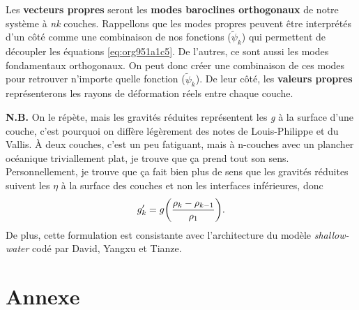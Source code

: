 \documentclass[10pt]{report}
\numberwithin{equation}{section}
\newcommand{\tpsi}{\tilde{\psi}}
\begin{document}
Les \textbf{vecteurs propres} seront les \textbf{modes baroclines orthogonaux} de notre système à \emph{nk} couches.
Rappellons que les modes propres peuvent être interprétés d'un côté comme une combinaison de nos fonctions (\(\tpsi_k\)) qui permettent de découpler les équations \ref{eq:org951a1c5}.
De l'autres, ce sont aussi les modes fondamentaux orthogonaux.
On peut donc créer une combinaison de ces modes pour retrouver n'importe quelle fonction (\(\tpsi_k\)).
De leur côté, les \textbf{valeurs propres} représenterons les rayons de déformation réels entre chaque couche.\bigskip



\textbf{N.B.} On le répète, mais les gravités réduites représentent les \emph{g} à la surface d'une couche, c'est pourquoi on diffère légèrement des notes de Louis-Philippe et du Vallis.
À deux couches, c'est un peu fatiguant, mais à n-couches avec un plancher océanique triviallement plat, je trouve que ça prend tout son sens.
Personnellement, je trouve que ça fait bien plus de sens que les gravités réduites suivent les \(\eta\) à la surface des couches et non les interfaces inférieures, donc
\begin{equation}
g_k' = g \qty(\frac{\rho_k - \rho_{k-1}}{\rho_1}).
\end{equation}
De plus, cette formulation est consistante avec l'architecture du modèle \emph{shallow-water} codé par David, Yangxu et Tianze.


\printbibliography


\section{Annexe}
\label{sec:org5ad7930}
\end{document}
